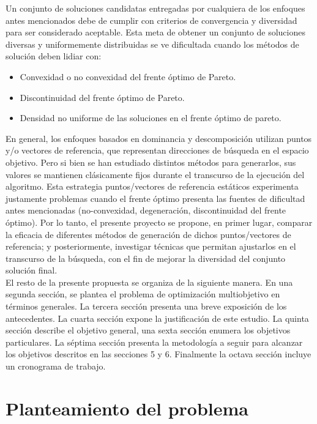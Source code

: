 \documentclass[letterpaper,10pt]{article}
\begin{document}
Un conjunto de soluciones candidatas entregadas por cualquiera de los enfoques antes mencionados debe de cumplir con criterios de convergencia y diversidad para ser
considerado aceptable. Esta meta de obtener un conjunto de soluciones diversas y uniformemente distribuidas se ve dificultada cuando los métodos de solución deben lidiar con:

\begin{itemize}
 \item Convexidad o no convexidad del frente óptimo de Pareto.
 \item Discontinuidad del frente óptimo de Pareto.
 \item Densidad no uniforme de las soluciones en el frente óptimo de pareto.
\end{itemize}

En general, los enfoques basados en dominancia y descomposición utilizan puntos y/o vectores de referencia, que representan direcciones de búsqueda en el espacio objetivo. Pero si bien se han estudiado distintos métodos para generarlos,
sus valores se mantienen clásicamente fijos durante el transcurso de la ejecución del algoritmo. Esta estrategia puntos/vectores de referencia estáticos experimenta justamente problemas cuando el frente óptimo presenta las fuentes de dificultad antes mencionadas (no-convexidad, degeneración, discontinuidad del frente óptimo).
Por lo tanto, el presente proyecto se propone, en primer lugar, comparar la eficacia de diferentes métodos de generación de dichos puntos/vectores de referencia;
y posteriormente, investigar técnicas que permitan ajustarlos en el transcurso de la búsqueda, con el fin de mejorar la diversidad del conjunto solución final.\\

El resto de la presente propuesta se organiza de la siguiente manera. En una segunda sección, se plantea el problema de optimización multiobjetivo en términos generales.
La tercera sección presenta una breve exposición de los antecedentes. La cuarta sección expone la justificación de este estudio. La quinta sección describe el objetivo general,
una sexta sección enumera los objetivos particulares. La séptima sección presenta la metodología a seguir para alcanzar los objetivos descritos en las secciones 5 y 6.
Finalmente la octava sección incluye un cronograma de trabajo.

 
\section{Planteamiento del problema}
\end{document}
